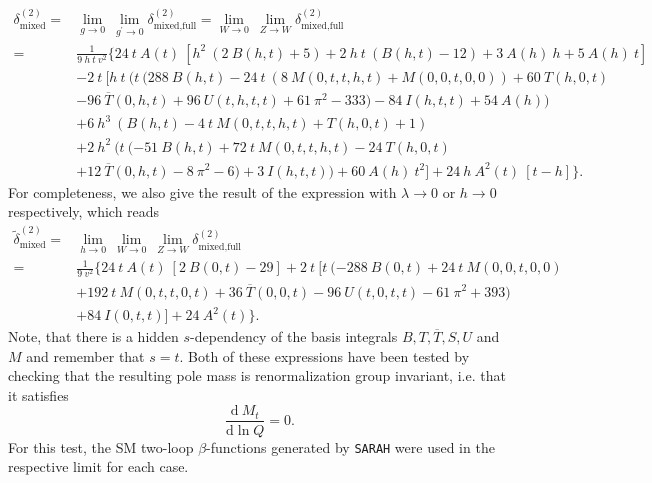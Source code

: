 \documentclass[a4paper,12pt]{book}
\begin{document}
\begin{align}
   \nonumber
\delta^{(2)}_\text{mixed} ={}& \lim_{g \rightarrow 0} \> \lim_{g^\prime \rightarrow 0} \delta^{(2)}_\text{mixed,full}=\lim_{W \rightarrow 0}\> \lim_{Z \rightarrow W} \delta^{(2)}_\text{mixed,full}\\
   \nonumber
={}& \frac{1}{9\> h\> t\> v^2}\{24\> t \>A(t)\> [h^2\> (2 \>B(h,t)+5)+2\> h \>t \>(B(h,t)-12)+3 \>A(h)\> h+5 \>A(h) \>t]\\
   \nonumber
& -2\> t\> [h\> t
   \>(t\> (288\> B(h,t)-24\> t \>(8\> M(0,t,t,h,t)+M(0,0,t,0,0))+60
\>T(h,0,t)\\
   \nonumber
& -96\> \overline{T}(0,h,t)+96
   \>U(t,h,t,t)+61 \>\pi ^2-333)-84 \>I(h,t,t)+54\>
A(h))\\
   \nonumber
& +6\> h^3 \>(B(h,t)-4\> t
   \>M(0,t,t,h,t)+T(h,0,t)+1)\\
      \nonumber
   &+2 \>h^2\> (t\> (-51 \>B(h,t)+72\> t
\>M(0,t,t,h,t)-24\> T(h,0,t)\\
& +12\>
   \overline{T}(0,h,t)-8\> \pi ^2-6) +3\> I(h,t,t))+60\> A(h) \>t^2]+24\> h\> A^2(t)\>
   [t-h]\}.
\end{align}
For completeness, we also give the result of the expression with $\lambda\rightarrow0$ or $h\rightarrow 0$ respectively, which reads
\begin{align}
      \nonumber
\tilde{\delta}^{(2)}_\text{mixed} ={}&\lim_{h \rightarrow 0} \> \lim_{W \rightarrow 0}\> \lim_{Z \rightarrow W} \delta^{(2)}_\text{mixed,full}\\
   \nonumber
={}& \frac{1}{9\> v^2} \{24\> t\> A(t)\> [2\> B(0,t)-29]+2\> t \>[t\> (-288\> B(0,t)+24\> t
\>M(0,0,t,0,0)\\
\nonumber
&+192\> t\> M(0,t,t,0,t)+36\>
   \overline{T}(0,0,t)-96\> U(t,0,t,t)-61\> \pi^2+393)\\
   &+84\>
I(0,t,t)]+24\> A^2(t)\}.
\end{align}
Note, that there is a hidden $s$-dependency of the basis integrals $B,T,\overline{T},S,U$ and $M$ and remember that $s=t$. Both of these expressions have been tested by checking that the resulting pole mass is renormalization group invariant, i.e. that it satisfies 
\begin{equation}
\frac{\text{d}\> M_t}{\text{d} \ln Q}=0.
\end{equation}
For this test, the SM two-loop $\beta$-functions generated by \texttt{SARAH} were used in the respective limit for each case. 
\end{document}
